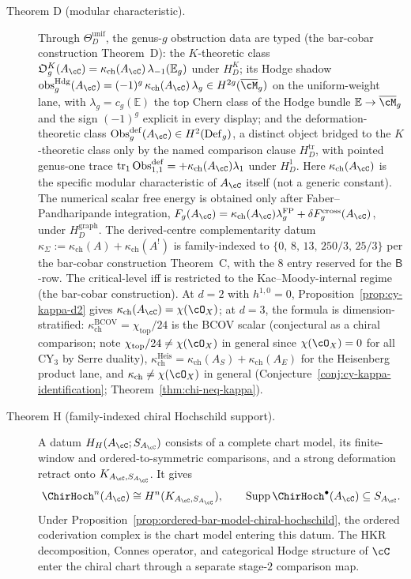 \begin{theorem*}
\begin{description}
 \item[Theorem D (modular characteristic).] Through $\Theta_D^{\mathrm{unif}}$, the genus-$g$ obstruction data are typed (the bar-cobar construction Theorem~D): the $K$-theoretic class $\mathfrak{O}_g^K(A_\cC) = \kappa_{\mathrm{ch}}(A_\cC)\,\lambda_{-1}(\mathbb{E}_g)$ under $H_D^K$; its Hodge shadow $\mathrm{obs}^{\mathrm{Hdg}}_g(A_\cC) = (-1)^g\,\kappa_{\mathrm{ch}}(A_\cC)\,\lambda_g \in H^{2g}(\overline{\cM}_g)$ on the uniform-weight lane, with $\lambda_g = c_g(\mathbb{E})$ the top Chern class of the Hodge bundle $\mathbb{E} \to \overline{\cM}_g$ and the sign $(-1)^g$ explicit in every display; and the deformation-theoretic class $\operatorname{Obs}^{\mathrm{def}}_g(A_\cC) \in H^2(\operatorname{Def}_g)$, a distinct object bridged to the $K$-theoretic class only by the named comparison clause $H_D^{\mathrm{tr}}$, with pointed genus-one trace $\operatorname{tr}_1\operatorname{Obs}^{\mathrm{def}}_{1,1} = +\kappa_{\mathrm{ch}}(A_\cC)\lambda_1$ under $H_D^1$. Here $\kappa_{\mathrm{ch}}(A_\cC)$ is the specific modular characteristic of $A_\cC$ itself (not a generic constant). The numerical scalar free energy is obtained only after Faber--Pandharipande integration, $F_g(A_\cC)=\kappa_{\mathrm{ch}}(A_\cC)\lambda_g^{\mathrm{FP}}+\delta F_g^{\mathrm{cross}}(A_\cC)$, under $H_D^{\mathrm{graph}}$. The derived-centre complementarity datum $\kappa_\Sigma := \kappa_{\mathrm{ch}}(A) + \kappa_{\mathrm{ch}}(A^!)$ is family-indexed to $\{0,\,8,\,13,\,250/3,\,25/3\}$ per the bar-cobar construction Theorem~C, with the $8$ entry reserved for the $\mathsf{B}$-row. The critical-level iff is restricted to the Kac--Moody-internal regime (the bar-cobar construction). At $d = 2$ with $h^{1,0} = 0$, Proposition~\ref{prop:cy-kappa-d2} gives $\kappa_{\mathrm{ch}}(A_\cC) = \chi(\cO_X)$; at $d = 3$, the formula is dimension-stratified: $\kappa_{\mathrm{ch}}^{\mathrm{BCOV}}=\chi_{\mathrm{top}}/24$ is the BCOV scalar (conjectural as a chiral comparison; note $\chi_{\mathrm{top}}/24 \neq \chi(\cO_X)$ in general since $\chi(\cO_X) = 0$ for all CY$_3$ by Serre duality), $\kappa_{\mathrm{ch}}^{\mathrm{Heis}} = \kappa_{\mathrm{ch}}(A_S) + \kappa_{\mathrm{ch}}(A_E)$ for the Heisenberg product lane, and $\kappa_{\mathrm{ch}} \neq \chi(\cO_X)$ in general (Conjecture~\ref{conj:cy-kappa-identification}; Theorem~\ref{thm:chi-neq-kappa}).

 \item[Theorem H (family-indexed chiral Hochschild support).]
 A datum $H_H(A_\cC;S_{A_\cC})$ consists of a complete chart model,
 its finite-window and ordered-to-symmetric comparisons, and a strong
 deformation retract onto $K_{A_\cC,S_{A_\cC}}$.  It gives
 \[
  \ChirHoch^n(A_\cC)\cong
  H^n(K_{A_\cC,S_{A_\cC}}),
  \qquad
  \operatorname{Supp}\ChirHoch^\bullet(A_\cC)
  \subseteq S_{A_\cC}.
 \]
 Under Proposition~\ref{prop:ordered-bar-model-chiral-hochschild},
 the ordered coderivation complex is the chart model entering this
 datum.  The HKR decomposition, Connes operator, and categorical
 Hodge structure of $\cC$ enter the chiral chart through a separate
 stage-$2$ comparison map.
\end{description}
\end{theorem*}

